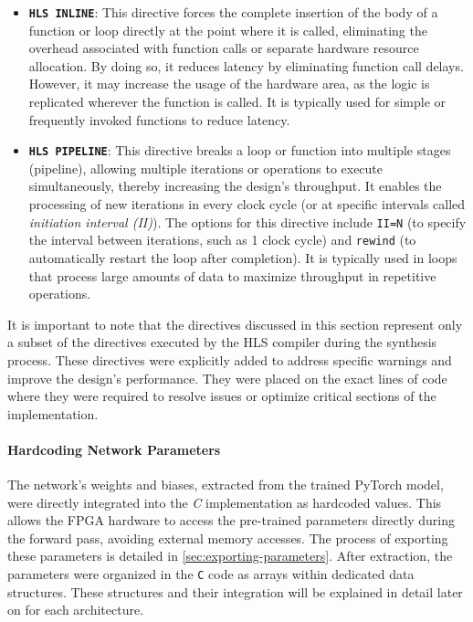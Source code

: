 \documentclass{article}
\begin{document}
\begin{itemize}
    \item \textbf{\texttt{HLS INLINE}}: This directive forces the complete insertion of the body of a function or loop directly at the point where it is called, eliminating the overhead associated with function calls or separate hardware resource allocation. By doing so, it reduces latency by eliminating function call delays. However, it may increase the usage of the hardware area, as the logic is replicated wherever the function is called. It is typically used for simple or frequently invoked functions to reduce latency.
    
    \item \textbf{\texttt{HLS PIPELINE}}: This directive breaks a loop or function into multiple stages (pipeline), allowing multiple iterations or operations to execute simultaneously, thereby increasing the design's throughput. It enables the processing of new iterations in every clock cycle (or at specific intervals called \textit{ initiation interval (II)}). The options for this directive include \texttt{II=N} (to specify the interval between iterations, such as 1 clock cycle) and \texttt{rewind} (to automatically restart the loop after completion). It is typically used in loops that process large amounts of data to maximize throughput in repetitive operations.

\end{itemize}

It is important to note that the directives discussed in this section represent only a subset of the directives executed by the HLS compiler during the synthesis process. These directives were explicitly added to address specific warnings and improve the design's performance. They were placed on the exact lines of code where they were required to resolve issues or optimize critical sections of the implementation.


\paragraph{Hardcoding Network Parameters}
The network's weights and biases, extracted from the trained PyTorch model, were directly integrated into the \textit{C} implementation as hardcoded values. This allows the FPGA hardware to access the pre-trained parameters directly during the forward pass, avoiding external memory accesses. The process of exporting these parameters is detailed in \ref{sec:exporting-parameters}. After extraction, the parameters were organized in the \texttt{C} code as arrays within dedicated data structures. These structures and their integration will be explained in detail later on for each architecture.
\end{document}
